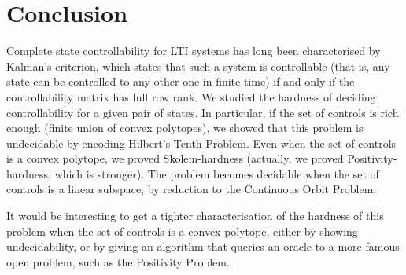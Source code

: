 \section{Conclusion}

Complete state controllability for LTI systems has long been characterised by Kalman's criterion, which states that such a system is controllable (that is, any state can be controlled to any other one in finite time) if and only if the controllability matrix has full row rank. We studied the hardness of deciding controllability for a given pair of states. In particular, if the set of controls is rich enough (finite union of convex polytopes), we showed that this problem is undecidable by encoding Hilbert's Tenth Problem. Even when the set of controls is a convex polytope, we proved Skolem-hardness (actually, we proved Positivity-hardness, which is stronger). The problem becomes decidable when the set of controls is a linear subspace, by reduction to the Continuous Orbit Problem.

It would be interesting to get a tighter characterisation of the hardness of this problem when the set of controls is a convex polytope, either by showing undecidability, or by giving an algorithm that queries an oracle to a more famous open problem, such as the Positivity Problem.
